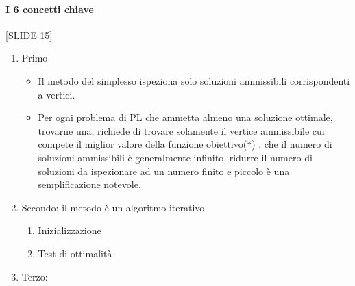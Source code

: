 \documentclass[12pt, a4paper, openany]{book}
\begin{document}
\paragraph*{I 6 concetti chiave} [SLIDE 15]
\begin{enumerate}
    \item Primo
        \begin{itemize}
            \item Il metodo del simplesso ispeziona solo
            soluzioni ammissibili corrispondenti a
            vertici.
            \item Per ogni problema di PL che ammetta
            almeno una soluzione ottimale, trovarne
            una, richiede di trovare solamente il vertice
            ammissibile cui compete il miglior valore
            della funzione obiettivo(*)
            .
            \itemDato che il numero di soluzioni ammissibili
            è generalmente infinito, ridurre il numero
            di soluzioni da ispezionare ad un numero
            finito e piccolo è una semplificazione
            notevole.
        \end{itemize}
    \item Secondo: il metodo è un algoritmo iterativo
    \begin{enumerate}
        \item Inizializzazione
        \item Test di ottimalità
    \end{enumerate}
    \item Terzo: 
\end{enumerate}
 
\end{document}
